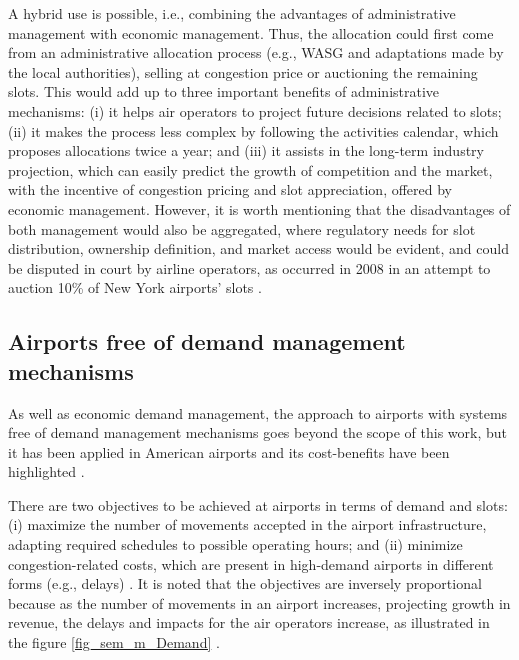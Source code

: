 A hybrid use is possible, i.e., combining the advantages of administrative management with economic management. Thus, the allocation could first come from an administrative allocation process (e.g., \acrshort{WASG} and adaptations made by the local authorities), selling at congestion price or auctioning the remaining slots. This would add up to three important benefits of administrative mechanisms: (i) it helps air operators to project future decisions related to slots; (ii) it makes the process less complex by following the activities calendar, which proposes allocations twice a year; and (iii) it assists in the long-term industry projection, which can easily predict the growth of competition and the market, with the incentive of congestion pricing and slot appreciation, offered by economic management. However, it is worth mentioning that the disadvantages of both management would also be aggregated, where regulatory needs for slot distribution, ownership definition, and market access would be evident, and could be disputed in court by airline operators, as occurred in 2008 in an attempt to auction 10\% of New York airports’ slots \cite{cavusoglu2021minimum, gillen2016airport, BichlerAuction2022}.

\subsection{Airports free of demand management mechanisms}

As well as economic demand management, the approach to airports with systems free of demand management mechanisms goes beyond the scope of this work, but it has been applied in American airports and its cost-benefits have been highlighted \cite{cavusoglu2021minimum, gillen2016airport}.

There are two objectives to be achieved at airports in terms of demand and slots: (i) maximize the number of movements accepted in the airport infrastructure, adapting required schedules to possible operating hours; and (ii) minimize congestion-related costs, which are present in high-demand airports in different forms (e.g., delays) \cite{cavusoglu2021minimum}. It is noted that the objectives are inversely proportional because as the number of movements in an airport increases, projecting growth in revenue, the delays and impacts for the air operators increase, as illustrated in the figure \ref{fig_sem_m_Demand} \cite{ zografos2017increasing, swaroop2012more, gillen2016airport}.


%
